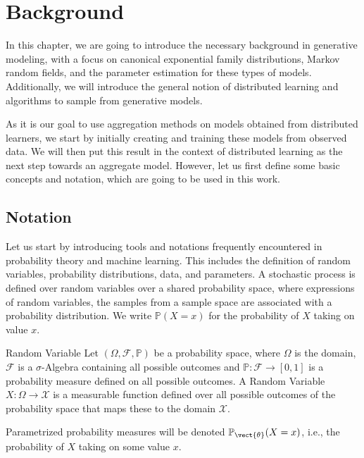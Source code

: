 \chapter{Background}
\label{chapter:kap2}
In this chapter, we are going to introduce the necessary background in generative modeling, with a focus on canonical exponential family distributions, Markov random fields, and the parameter estimation for these types of models.
Additionally, we will introduce the general notion of distributed learning and algorithms to sample from generative models.

As it is our goal to use aggregation methods on models obtained from distributed learners, we start by initially creating and training these models from observed data. 
We will then put this result in the context of distributed learning as the next step towards an aggregate model.
However, let us first define some basic concepts and notation, which are going to be used in this work.


\section{Notation}
    \label{sec:nota}
    Let us start by introducing tools and notations frequently encountered in probability theory and machine learning.
    This includes the definition of random variables, probability distributions, data, and parameters.
    A stochastic process is defined over random variables over a shared probability space, where expressions of random variables, the samples from a sample space are associated with a probability distribution. 
    We write $\mathbb{P}(X = x)$ for the probability of $X$ taking on value $x$.
    \begin{definition}{Random Variable}
        \label{def:randvar}
        Let $(\Omega, \mathcal{F}, \mathbb{P})$ be a probability space, where $\Omega$ is the domain, $\mathcal{F}$ is a $\sigma$-Algebra containing all possible outcomes and $\mathbb{P}: \mathcal{F} \rightarrow [0,1]$ is a probability measure defined on all possible outcomes.
        A Random Variable $X: \Omega \rightarrow \mathcal{X}$ is a measurable function defined over all possible outcomes of the probability space that maps these to the domain $\mathcal{X}$.

        Parametrized probability measures will be denoted $\mathbb{P}_{\vect{\theta}} (X = x)$, i.e., the probability of $X$ taking on some value $x$.
    \end{definition}

